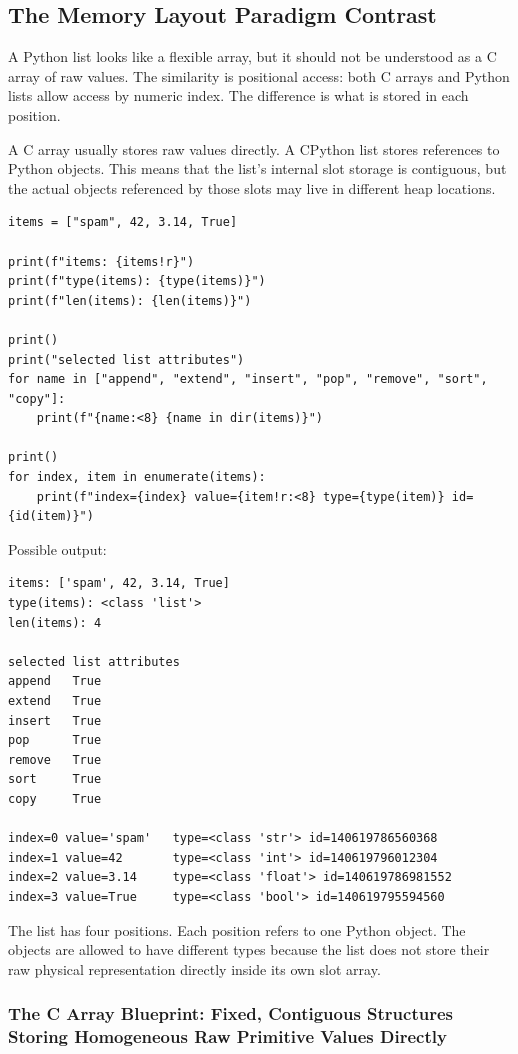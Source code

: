 \subsection{The Memory Layout Paradigm Contrast}

A Python list looks like a flexible array, but it should not be understood as a C array of raw values. The similarity is positional access: both C arrays and Python lists allow access by numeric index. The difference is what is stored in each position.

A C array usually stores raw values directly. A CPython list stores references to Python objects. This means that the list's internal slot storage is contiguous, but the actual objects referenced by those slots may live in different heap locations.

\begin{verbatim}
items = ["spam", 42, 3.14, True]

print(f"items: {items!r}")
print(f"type(items): {type(items)}")
print(f"len(items): {len(items)}")

print()
print("selected list attributes")
for name in ["append", "extend", "insert", "pop", "remove", "sort", "copy"]:
    print(f"{name:<8} {name in dir(items)}")

print()
for index, item in enumerate(items):
    print(f"index={index} value={item!r:<8} type={type(item)} id={id(item)}")
\end{verbatim}

Possible output:

\begin{verbatim}
items: ['spam', 42, 3.14, True]
type(items): <class 'list'>
len(items): 4

selected list attributes
append   True
extend   True
insert   True
pop      True
remove   True
sort     True
copy     True

index=0 value='spam'   type=<class 'str'> id=140619786560368
index=1 value=42       type=<class 'int'> id=140619796012304
index=2 value=3.14     type=<class 'float'> id=140619786981552
index=3 value=True     type=<class 'bool'> id=140619795594560
\end{verbatim}

The list has four positions. Each position refers to one Python object. The objects are allowed to have different types because the list does not store their raw physical representation directly inside its own slot array.

\subsubsection{The C Array Blueprint: Fixed, Contiguous Structures Storing Homogeneous Raw Primitive Values Directly}

